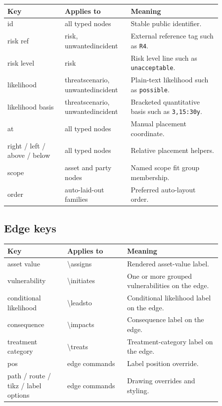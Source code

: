 \documentclass[a4paper]{article}
\begin{document}
\begin{center}
\begin{tabular}{>{\ttfamily}p{0.24\linewidth}p{0.24\linewidth}p{0.38\linewidth}}
\hline
Key & Applies to & Meaning \\
\hline
id & all typed nodes & Stable public identifier. \\
risk ref & risk, unwantedincident & External reference tag such as \texttt{R4}. \\
risk level & risk & Risk level line such as \texttt{unacceptable}. \\
likelihood & threatscenario, unwantedincident & Plain-text likelihood such as \texttt{possible}. \\
likelihood basis & threatscenario, unwantedincident & Bracketed quantitative basis such as \texttt{3,15:30y}. \\
at & all typed nodes & Manual placement coordinate. \\
right / left / above / below & all typed nodes & Relative placement helpers. \\
scope & asset and party nodes & Named scope fit group membership. \\
order & auto-laid-out families & Preferred auto-layout order. \\
\hline
\end{tabular}
\end{center}

\subsection{Edge keys}

\begin{center}
\begin{tabular}{>{\ttfamily}p{0.24\linewidth}p{0.24\linewidth}p{0.38\linewidth}}
\hline
Key & Applies to & Meaning \\
\hline
asset value & \textbackslash assigns & Rendered asset-value label. \\
vulnerability & \textbackslash initiates & One or more grouped vulnerabilities on the edge. \\
conditional likelihood & \textbackslash leadsto & Conditional likelihood label on the edge. \\
consequence & \textbackslash impacts & Consequence label on the edge. \\
treatment category & \textbackslash treats & Treatment-category label on the edge. \\
pos & edge commands & Label position override. \\
path / route / tikz / label options & edge commands & Drawing overrides and styling. \\
\hline
\end{tabular}
\end{center}
\end{document}
